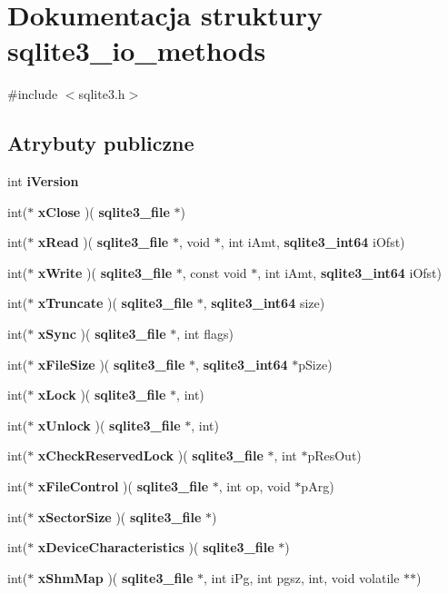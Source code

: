 \section{Dokumentacja struktury sqlite3\+\_\+io\+\_\+methods}
\label{structsqlite3__io__methods}


{\ttfamily \#include $<$sqlite3.\+h$>$}

\subsection*{Atrybuty publiczne}
\begin{DoxyCompactItemize}
\item 
int \textbf{ i\+Version}
\item 
int($\ast$ \textbf{ x\+Close} )(\textbf{ sqlite3\+\_\+file} $\ast$)
\item 
int($\ast$ \textbf{ x\+Read} )(\textbf{ sqlite3\+\_\+file} $\ast$, void $\ast$, int i\+Amt, \textbf{ sqlite3\+\_\+int64} i\+Ofst)
\item 
int($\ast$ \textbf{ x\+Write} )(\textbf{ sqlite3\+\_\+file} $\ast$, const void $\ast$, int i\+Amt, \textbf{ sqlite3\+\_\+int64} i\+Ofst)
\item 
int($\ast$ \textbf{ x\+Truncate} )(\textbf{ sqlite3\+\_\+file} $\ast$, \textbf{ sqlite3\+\_\+int64} size)
\item 
int($\ast$ \textbf{ x\+Sync} )(\textbf{ sqlite3\+\_\+file} $\ast$, int flags)
\item 
int($\ast$ \textbf{ x\+File\+Size} )(\textbf{ sqlite3\+\_\+file} $\ast$, \textbf{ sqlite3\+\_\+int64} $\ast$p\+Size)
\item 
int($\ast$ \textbf{ x\+Lock} )(\textbf{ sqlite3\+\_\+file} $\ast$, int)
\item 
int($\ast$ \textbf{ x\+Unlock} )(\textbf{ sqlite3\+\_\+file} $\ast$, int)
\item 
int($\ast$ \textbf{ x\+Check\+Reserved\+Lock} )(\textbf{ sqlite3\+\_\+file} $\ast$, int $\ast$p\+Res\+Out)
\item 
int($\ast$ \textbf{ x\+File\+Control} )(\textbf{ sqlite3\+\_\+file} $\ast$, int op, void $\ast$p\+Arg)
\item 
int($\ast$ \textbf{ x\+Sector\+Size} )(\textbf{ sqlite3\+\_\+file} $\ast$)
\item 
int($\ast$ \textbf{ x\+Device\+Characteristics} )(\textbf{ sqlite3\+\_\+file} $\ast$)
\item 
int($\ast$ \textbf{ x\+Shm\+Map} )(\textbf{ sqlite3\+\_\+file} $\ast$, int i\+Pg, int pgsz, int, void volatile $\ast$$\ast$)
$$
\end{DoxyCompactItemize}
